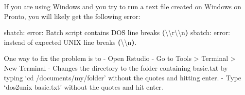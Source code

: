 \documentclass[
]{book}
\newenvironment{Shaded}{\begin{snugshade}}{\end{snugshade}}
\newcommand{\BuiltInTok}[1]{#1}
\newcommand{\ErrorTok}[1]{\textcolor[rgb]{0.64,0.00,0.00}{\textbf{#1}}}
\newcommand{\ExtensionTok}[1]{#1}
\newcommand{\KeywordTok}[1]{\textcolor[rgb]{0.13,0.29,0.53}{\textbf{#1}}}
\newcommand{\NormalTok}[1]{#1}
\begin{document}
If you are using Windows and you try to run a text file created on Windows on Pronto, you will likely get the following error:

\begin{Shaded}
\begin{Highlighting}[]
\ExtensionTok{sbatch:}\NormalTok{ error: Batch script contains DOS line breaks }\ErrorTok{(}\ExtensionTok{\textbackslash{}\textbackslash{}r\textbackslash{}\textbackslash{}n}\KeywordTok{)}
\ExtensionTok{sbatch:}\NormalTok{ error: instead of expected UNIX line breaks }\ErrorTok{(}\ExtensionTok{\textbackslash{}\textbackslash{}n}\KeywordTok{)}\BuiltInTok{.}
\end{Highlighting}
\end{Shaded}

One way to fix the problem is to
- Open Rstudio
- Go to Tools \textgreater{} Terminal \textgreater{} New Terminal
- Changes the directory to the folder containing basic.txt by typing `cd /documents/my/folder' without the quotes and hitting enter.
- Type `dos2unix basic.txt' without the quotes and hit enter.

  
\end{document}
